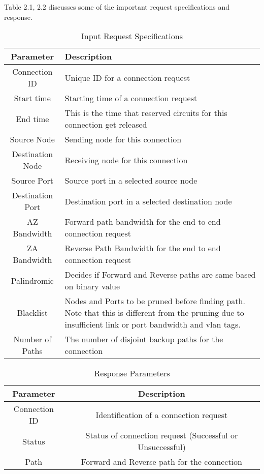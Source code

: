 Table 2.1, 2.2 discusses some of the important request specifications and response. 
\begin{table}[hbt!]
\centering
\caption{Input Request Specifications}
 	\begin{tabular}{|c|m{24em}|}
	\hline\hline
	\textbf{Parameter} & \textbf{Description} \\
	\hline
	Connection ID&Unique ID for a connection request\\
	\hline
	Start time&Starting time of a connection request\\
	\hline
	End time&This is the time that reserved circuits for this connection get released\\
	\hline
	Source Node&Sending node for this connection\\
	\hline
	Destination Node&Receiving node for this connection\\
	\hline
	Source Port&Source port in a selected source node\\
	\hline
	Destination Port&Destination port in a selected destination node\\
	\hline
	AZ Bandwidth& Forward path bandwidth for the end to end connection request\\
	\hline
	ZA Bandwidth& Reverse Path Bandwidth for the end to end connection request\\
	\hline
	Palindromic&Decides if Forward and Reverse paths are same based on binary value\\
	\hline
	Blacklist&Nodes and Ports to be pruned before finding path. Note that this is different from the pruning due to insufficient link or port bandwidth and vlan tags.\\
	\hline
	Number of Paths&The number of disjoint backup paths for the connection\\
	\hline
	\end{tabular}
\end{table}

\begin{table}[hbt!]
\centering
\caption{Response Parameters}
 	\begin{tabular}{|c|c|}
	\hline\hline
	\textbf{Parameter} & \textbf{Description} \\
	\hline
	Connection ID&Identification of a connection request\\
	\hline
	Status&Status of connection request (Successful or Unsuccessful)\\
	\hline
	Path&Forward and Reverse path for the connection\\  
	\hline
	\end{tabular}
\end{table}


